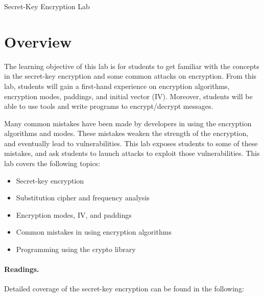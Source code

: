 






\begin{center}
{\LARGE Secret-Key Encryption Lab}
\end{center}


\setcounter{task}{1}
\newcommand{\tasks} {\bf {\noindent (\arabic{task})} \addtocounter{task}{1} \,}



\section{Overview}

The learning objective of this lab is for students to get familiar with
the concepts in the secret-key encryption and some common attacks 
on encryption. From this lab, students will gain a first-hand experience
on encryption algorithms, encryption modes, paddings, and initial vector (IV). 
Moreover, students will be able to use tools and write programs to 
encrypt/decrypt messages. 

Many common mistakes have been made by developers in using 
the encryption algorithms and modes. These mistakes
weaken the strength of the encryption, and eventually
lead to vulnerabilities. This lab exposes students to 
some of these mistakes, and ask students to launch attacks
to exploit those vulnerabilities. This lab covers the following topics:

\begin{itemize}[noitemsep]
\item Secret-key encryption
\item Substitution cipher and frequency analysis
\item Encryption modes, IV, and paddings
\item Common mistakes in using encryption algorithms
\item Programming using the crypto library
\end{itemize}


\paragraph{Readings.}
Detailed coverage of the secret-key encryption can be found in the following:

